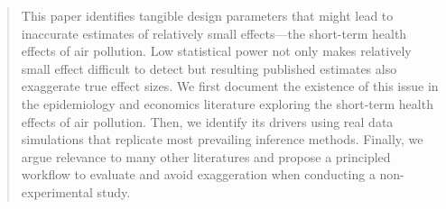 \documentclass[12pt]{article}
\begin{document}
\begin{titlepage}
\begin{abstract}
\small
\noindent
This paper identifies tangible design parameters that might lead to inaccurate estimates of relatively small effects---the short-term health effects of air pollution. Low statistical power not only makes relatively small effect difficult to detect but resulting published estimates also exaggerate true effect sizes. We first document the existence of this issue in the epidemiology and economics literature exploring the short-term health effects of air pollution. Then, we identify its drivers using real data simulations that replicate most prevailing inference methods. Finally, we argue relevance to many other literatures and propose a principled workflow to evaluate and avoid exaggeration when conducting a non-experimental study.




\end{abstract}
\end{titlepage}
\end{document}
